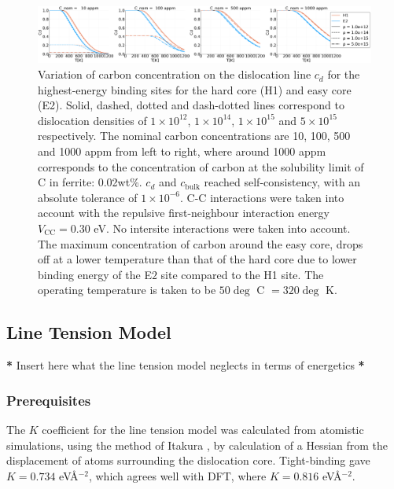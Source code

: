 \documentclass[a4paper,11pt]{article}
\begin{document}
\begin{landscape}
 \begin{figure}
  \includegraphics[width=1.6\textwidth]{Images/mcclean_isotherm_all_e2_h1.png}
   \caption{Variation of carbon concentration on the dislocation line $c_d$ for the highest-energy binding sites for the hard core (H1) and easy core (E2). Solid, dashed, dotted and dash-dotted lines correspond to dislocation densities of $1\times10^{12}$, $1\times10^{14}$, $1\times10^{15}$ and $5\times10^{15}$ respectively. The nominal carbon concentrations are 10, 100, 500 and 1000 appm from left to right, where around 1000 appm corresponds to the concentration of carbon at the solubility limit of C in ferrite: 0.02wt\%. $c_d$ and $c_{\text{bulk}}$ reached self-consistency, with an absolute tolerance of $1\times 10^{-6}$. C-C interactions were taken into account with the repulsive first-neighbour interaction energy $V_{\text{CC}}=0.30$ eV. No intersite interactions were taken into account. The maximum concentration of carbon around the easy core, drops off at a lower temperature than that of the hard core due to lower binding energy of the E$2$ site compared to the H1 site. The operating temperature is taken to be $50\deg$ C $= 320 \deg$ K.}\label{cdhardeasy}
\end{figure}
\end{landscape}





\subsection{Line Tension Model}
\label{sec:org7d8e045}
\label{sec:ltmodel}

\textbf{*} Insert here what the line tension model neglects in terms of energetics \textbf{*}
\subsubsection{Prerequisites}
\label{sec:org711036d}

The \(K\) coefficient for the line tension model was calculated from atomistic simulations, using
the method of Itakura \cite{Itakura2012}, by calculation of a Hessian from the displacement of
atoms surrounding the dislocation core. Tight-binding gave \(K = 0.734\) eV\AA{}\(^{-2}\), which agrees well
with DFT, where \(K = 0.816\) eV\AA{}\(^{-2}\).
\end{document}
